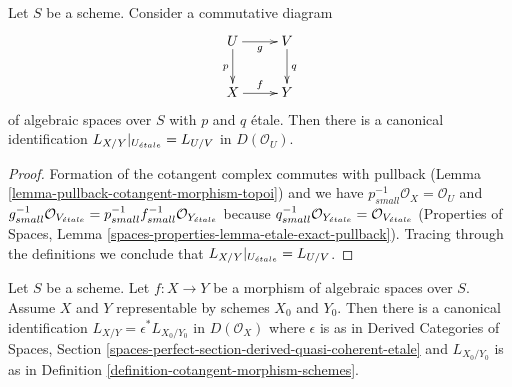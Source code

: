 \begin{lemma}
\label{lemma-etale-localization}
Let $S$ be a scheme. Consider a commutative diagram
$$
\xymatrix{
U \ar[d]_p \ar[r]_g & V \ar[d]^q \\
X \ar[r]^f & Y
}
$$
of algebraic spaces over $S$ with $p$ and $q$ \'etale.
Then there is a canonical identification
$L_{X/Y}|_{U_{\acute{e}tale}} = L_{U/V}$ in $D(\mathcal{O}_U)$.
\end{lemma}

\begin{proof}
Formation of the cotangent complex commutes with pullback
(Lemma \ref{lemma-pullback-cotangent-morphism-topoi}) and
we have $p_{small}^{-1}\mathcal{O}_X = \mathcal{O}_U$ and
$g_{small}^{-1}\mathcal{O}_{V_{\acute{e}tale}} =
p_{small}^{-1}f_{small}^{-1}\mathcal{O}_{Y_{\acute{e}tale}}$
because $q_{small}^{-1}\mathcal{O}_{Y_{\acute{e}tale}} =
\mathcal{O}_{V_{\acute{e}tale}}$
(Properties of Spaces, Lemma
\ref{spaces-properties-lemma-etale-exact-pullback}).
Tracing through the definitions we conclude that
$L_{X/Y}|_{U_{\acute{e}tale}} = L_{U/V}$.
\end{proof}

\begin{lemma}
\label{lemma-compare-spaces-schemes}
Let $S$ be a scheme. Let $f : X \to Y$ be a morphism of algebraic spaces
over $S$. Assume $X$ and $Y$ representable by schemes $X_0$ and $Y_0$.
Then there is a canonical identification
$L_{X/Y} = \epsilon^*L_{X_0/Y_0}$ in $D(\mathcal{O}_X)$
where $\epsilon$ is as in Derived Categories of Spaces, Section
\ref{spaces-perfect-section-derived-quasi-coherent-etale}
and $L_{X_0/Y_0}$ is as in
 Definition \ref{definition-cotangent-morphism-schemes}.
\end{lemma}

